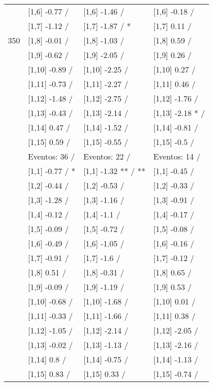 \begin{table}
\begin{tabular}[t]{llll}
 & {}[1,6] -0.77  / & {}[1,6] -1.46  / & {}[1,6] -0.18  /\\
 & {}[1,7] -1.12  / & {}[1,7] -1.87  / * & {}[1,7] 0.11  /\\
350 & {}[1,8] -0.01  / & {}[1,8] -1.03  / & {}[1,8] 0.59  /\\
\addlinespace
 & {}[1,9] -0.62  / & {}[1,9] -2.05  / & {}[1,9] 0.26  /\\
 & {}[1,10] -0.89  / & {}[1,10] -2.25  / & {}[1,10] 0.27  /\\
 & {}[1,11] -0.73  / & {}[1,11] -2.27  / & {}[1,11] 0.46  /\\
 & {}[1,12] -1.48  / & {}[1,12] -2.75  / & {}[1,12] -1.76  /\\
 & {}[1,13] -0.43  / & {}[1,13] -2.14  / & {}[1,13] -2.18 * /\\
\addlinespace
 & {}[1,14] 0.47  / & {}[1,14] -1.52  / & {}[1,14] -0.81  /\\
 & {}[1,15] 0.59  / & {}[1,15] -0.55  / & {}[1,15] -0.5  /\\
 & Eventos:  36 / & Eventos:  22 / & Eventos:  14 /\\
 & {}[1,1] -0.77  / * & {}[1,1] -1.32 ** / ** & {}[1,1] -0.45  /\\
 & {}[1,2] -0.44  / & {}[1,2] -0.53  / & {}[1,2] -0.33  /\\
\addlinespace
 & {}[1,3] -1.28  / & {}[1,3] -1.16  / & {}[1,3] -0.91  /\\
 & {}[1,4] -0.12  / & {}[1,4] -1.1  / & {}[1,4] -0.17  /\\
 & {}[1,5] -0.09  / & {}[1,5] -0.72  / & {}[1,5] -0.08  /\\
 & {}[1,6] -0.49  / & {}[1,6] -1.05  / & {}[1,6] -0.16  /\\
 & {}[1,7] -0.91  / & {}[1,7] -1.6  / & {}[1,7] -0.12  /\\
\addlinespace
500 & {}[1,8] 0.51  / & {}[1,8] -0.31  / & {}[1,8] 0.65  /\\
 & {}[1,9] -0.09  / & {}[1,9] -1.19  / & {}[1,9] 0.53  /\\
 & {}[1,10] -0.68  / & {}[1,10] -1.68  / & {}[1,10] 0.01  /\\
 & {}[1,11] -0.33  / & {}[1,11] -1.66  / & {}[1,11] 0.38  /\\
 & {}[1,12] -1.05  / & {}[1,12] -2.14  / & {}[1,12] -2.05  /\\
\addlinespace
 & {}[1,13] -0.02  / & {}[1,13] -1.13  / & {}[1,13] -2.16  /\\
 & {}[1,14] 0.8  / & {}[1,14] -0.75  / & {}[1,14] -1.13  /\\
 & {}[1,15] 0.83  / & {}[1,15] 0.33  / & {}[1,15] -0.74  /\\
\bottomrule
\end{tabular}
\end{table}
